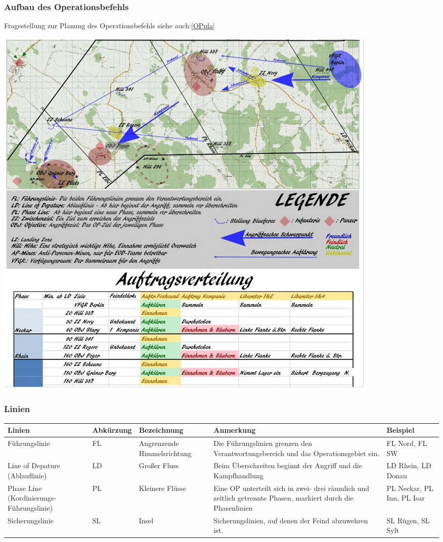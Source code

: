 \newpage

\subsubsection{Aufbau des Operationsbefehls}
\label{OPbef}
Fragestellung zur Planung des Operationsbefehls siehe auch:\ref{OPpla}

\begin{minipage}[t]{1\textwidth}
	\includegraphics[width=\textwidth]{./img/fortgeschrittenes/karteUndMarkierungen/OP-Befehl.png}
\end{minipage}

\subsubsection{Linien}
\begin{longtable}{|p{3cm}|p{}|p{}|p{4cm}|p{}|} 																											\hline
	Linien				&		Abkürzung			&		Bezeichnung				&			Anmerkung 									&		Beispiel 			\\ \hline
	Führungslinie			&		FL				&		Angrenzende Himmelsrichtung	&			Die Führungslinien grenzen \newline den Verantwortungsbereich und \newline das Operationsgebiet ein. & FL Nord, FL SW \\ \hline
	Line of Depature (Ablauflinie)&		LD				&		Großer Fluss				&			Beim Überschreiten beginnt der Angriff und die Kampfhandlung 	&	LD Rhein, LD Donau			\\ \hline
	Phase Line (Kordinierungs-Führungslinie) & PL				&		Kleinere Flüsse			&			Eine OP unterteilt sich in zwei- drei räumlich und zeitlich getrennte Phasen, markiert durch die Phasenlinien	& PL Neckar, PL Inn, PL Isar	\\ \hline
	Sicherungslinie 		&		SL 				&		Insel					&			Sicherungslinien, auf denen der Feind abzuwehren ist.		&	SL Rügen, SL Sylt			\\ \hline
\end{longtable}

